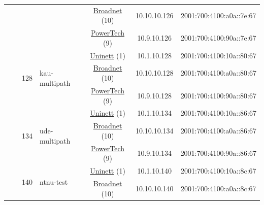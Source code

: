 \begin{small}
\begin{center}
\begin{longtable}{|c|c|c|c|c|c|c|c|}
  &  &  &  & \multicolumn{2}{|c|}{\tiny{\href{https://www.broadnet.no}{Broadnet} (10)}} & \tiny{10.10.10.126} & \tiny{2001:700:4100:a0a::7e:67} \\* \cline{5-5}\cline{6-6}\cline{7-7}\cline{8-8}
  &  &  &  & \multicolumn{2}{|c|}{\tiny{\href{http://www.powertech.no}{PowerTech} (9)}} & \tiny{10.9.10.126} & \tiny{2001:700:4100:90a::7e:67} \\* \cline{3-3}\cline{4-4}\cline{5-5}\cline{6-6}\cline{7-7}\cline{8-8}
  &  & \multirow{3}{*}{\tiny{128}} & \multicolumn{1}{|l|}{\multirow{3}{*}{\tiny{kau-multipath}}} & \multicolumn{2}{|c|}{\tiny{\href{https://www.uninett.no}{Uninett} (1)}} & \tiny{10.1.10.128} & \tiny{2001:700:4100:10a::80:67} \\* \cline{5-5}\cline{6-6}\cline{7-7}\cline{8-8}
  &  &  &  & \multicolumn{2}{|c|}{\tiny{\href{https://www.broadnet.no}{Broadnet} (10)}} & \tiny{10.10.10.128} & \tiny{2001:700:4100:a0a::80:67} \\* \cline{5-5}\cline{6-6}\cline{7-7}\cline{8-8}
  &  &  &  & \multicolumn{2}{|c|}{\tiny{\href{http://www.powertech.no}{PowerTech} (9)}} & \tiny{10.9.10.128} & \tiny{2001:700:4100:90a::80:67} \\* \cline{3-3}\cline{4-4}\cline{5-5}\cline{6-6}\cline{7-7}\cline{8-8}
  &  & \multirow{3}{*}{\tiny{134}} & \multicolumn{1}{|l|}{\multirow{3}{*}{\tiny{ude-multipath}}} & \multicolumn{2}{|c|}{\tiny{\href{https://www.uninett.no}{Uninett} (1)}} & \tiny{10.1.10.134} & \tiny{2001:700:4100:10a::86:67} \\* \cline{5-5}\cline{6-6}\cline{7-7}\cline{8-8}
  &  &  &  & \multicolumn{2}{|c|}{\tiny{\href{https://www.broadnet.no}{Broadnet} (10)}} & \tiny{10.10.10.134} & \tiny{2001:700:4100:a0a::86:67} \\* \cline{5-5}\cline{6-6}\cline{7-7}\cline{8-8}
  &  &  &  & \multicolumn{2}{|c|}{\tiny{\href{http://www.powertech.no}{PowerTech} (9)}} & \tiny{10.9.10.134} & \tiny{2001:700:4100:90a::86:67} \\* \cline{3-3}\cline{4-4}\cline{5-5}\cline{6-6}\cline{7-7}\cline{8-8}
  &  & \multirow{3}{*}{\tiny{140}} & \multicolumn{1}{|l|}{\multirow{3}{*}{\tiny{ntnu-test}}} & \multicolumn{2}{|c|}{\tiny{\href{https://www.uninett.no}{Uninett} (1)}} & \tiny{10.1.10.140} & \tiny{2001:700:4100:10a::8c:67} \\* \cline{5-5}\cline{6-6}\cline{7-7}\cline{8-8}
  &  &  &  & \multicolumn{2}{|c|}{\tiny{\href{https://www.broadnet.no}{Broadnet} (10)}} & \tiny{10.10.10.140} & \tiny{2001:700:4100:a0a::8c:67} \\* \cline{5-5}\cline{6-6}\cline{7-7}\cline{8-8}

\end{longtable}
\end{center}
\end{small}
